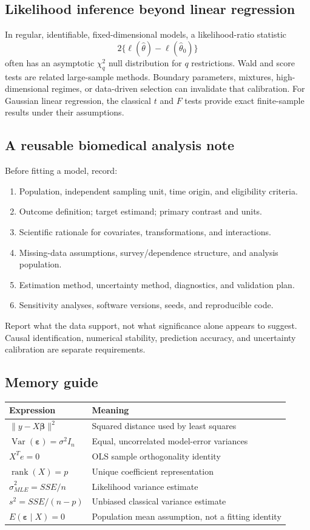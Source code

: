 \documentclass[11pt]{article}
\newcommand{\be}{\boldsymbol\beta}\newcommand{\eps}{\boldsymbol\varepsilon}\newcommand{\one}{\mathbf1}\newcommand{\R}{\mathbb R}
\begin{document}
\subsection{Likelihood inference beyond linear regression}
In regular, identifiable, fixed-dimensional models, a likelihood-ratio statistic
\[
2\{\ell(\widehat\theta)-\ell(\widehat\theta_0)\}
\]
often has an asymptotic $\chi_q^2$ null distribution for $q$ restrictions. Wald and score tests are related large-sample methods. Boundary parameters, mixtures, high-dimensional regimes, or data-driven selection can invalidate that calibration. For Gaussian linear regression, the classical $t$ and $F$ tests provide exact finite-sample results under their assumptions.

\subsection{A reusable biomedical analysis note}
Before fitting a model, record:
\begin{enumerate}
\item Population, independent sampling unit, time origin, and eligibility criteria.
\item Outcome definition; target estimand; primary contrast and units.
\item Scientific rationale for covariates, transformations, and interactions.
\item Missing-data assumptions, survey/dependence structure, and analysis population.
\item Estimation method, uncertainty method, diagnostics, and validation plan.
\item Sensitivity analyses, software versions, seeds, and reproducible code.
\end{enumerate}
Report what the data support, not what significance alone appears to suggest. Causal identification, numerical stability, prediction accuracy, and uncertainty calibration are separate requirements.

\subsection{Memory guide}
\par\smallskip
\begin{tabularx}{\linewidth}{p{.30\linewidth}L}\toprule
Expression&Meaning\\\midrule
$\|y-X\be\|^2$&Squared distance used by least squares\\
$\operatorname{Var}(\eps)=\sigma^2I_n$&Equal, uncorrelated model-error variances\\
$X^Te=0$&OLS sample orthogonality identity\\
$\operatorname{rank}(X)=p$&Unique coefficient representation\\
$\widehat\sigma^2_{MLE}=SSE/n$&Likelihood variance estimate\\
$s^2=SSE/(n-p)$&Unbiased classical variance estimate\\
$E(\eps\mid X)=0$&Population mean assumption, not a fitting identity\\\bottomrule
\end{tabularx}
\par\smallskip
\end{document}
